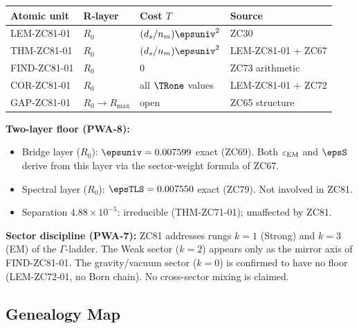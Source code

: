 \documentclass[12pt, a4paper]{article}
\renewcommand{\epsEM}{\varepsilon_{\rm EM}}
\begin{document}
\begin{layerbox}[title={R-Layer Assignments for ZC81}]

{\small\renewcommand{\arraystretch}{1.25}
\begin{center}
\begin{tabular}{@{}llll@{}}
\toprule
Atomic unit & R-layer & Cost $T$ & Source \\
\midrule
LEM-ZC81-01  & $R_0$ & $(d_s/n_m)\epsuniv^2$ & ZC30 \\
THM-ZC81-01  & $R_0$ & $(d_s/n_m)\epsuniv^2$ & LEM-ZC81-01 + ZC67 \\
FIND-ZC81-01 & $R_0$ & $0$ & ZC73 arithmetic \\
COR-ZC81-01  & $R_0$ & all $\TRone$ values & LEM-ZC81-01 + ZC72 \\
GAP-ZC81-01  & $R_0{\to}R_{\max}$ & open & ZC65 structure \\
\bottomrule
\end{tabular}
\end{center}}

\textbf{Two-layer floor (PWA-8):}
\begin{itemize}[leftmargin=2em, noitemsep]
  \item Bridge layer ($R_0$): $\epsuniv = 0.007599$ exact (ZC69).
    Both $\epsEM$ and $\epsS$ derive from this layer via the
    sector-weight formula of ZC67.
  \item Spectral layer ($R_0$): $\epsTLS = 0.007550$ exact (ZC79).
    Not involved in ZC81.
  \item Separation $4.88\times10^{-5}$: irreducible (THM-ZC71-01);
    unaffected by ZC81.
\end{itemize}

\textbf{Sector discipline (PWA-7):}
ZC81 addresses rungs $k=1$ (Strong) and $k=3$ (EM) of the
$\Gamma$-ladder. The Weak sector ($k=2$) appears only as the
mirror axis of FIND-ZC81-01. The gravity/vacuum sector ($k=0$)
is confirmed to have no floor (LEM-ZC72-01, no Born chain).
No cross-sector mixing is claimed.
\end{layerbox}

\subsection{Genealogy Map}
\label{sec:genealogy}
\end{document}
